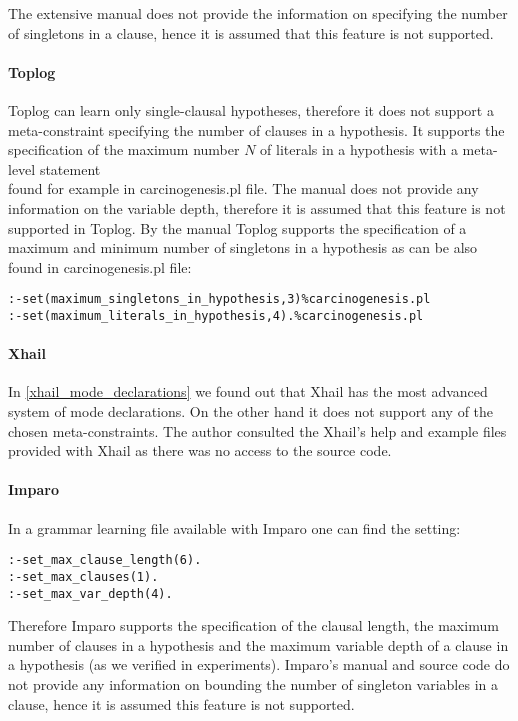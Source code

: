The extensive manual does not provide the information on specifying the number of singletons in a clause, hence it is assumed that this feature is not supported.

\paragraph{Toplog}
Toplog can learn only single-clausal hypotheses\cite{muggleton2012mc}, therefore it does not support a meta-constraint specifying the number of clauses in a hypothesis. It supports the specification of the maximum number $N$ of literals in a hypothesis with a meta-level statement\\
 found for example in carcinogenesis.pl file\cite{santos2008toplogWebsite}. The manual does not provide any information on the variable depth, therefore it is assumed that this feature is not supported in Toplog.
By the manual Toplog supports the specification of a maximum and minimum number of singletons in a hypothesis as can be also found in carcinogenesis.pl file:
\begin{lstlisting}
:-set(maximum_singletons_in_hypothesis,3)%carcinogenesis.pl
:-set(maximum_literals_in_hypothesis,4).%carcinogenesis.pl
\end{lstlisting}

\paragraph{Xhail}
In \ref{xhail_mode_declarations} we found out that Xhail has the most advanced system of mode declarations. On the other hand it does not support any of the chosen meta-constraints\cite{ray2007xhail}. The author consulted the Xhail's help and example files provided with Xhail as there was no access to the source code.

\paragraph{Imparo}
In a grammar learning file available with Imparo\cite{kimber2013imparo} one can find the setting:
\begin{lstlisting}
:-set_max_clause_length(6).
:-set_max_clauses(1).
:-set_max_var_depth(4).
\end{lstlisting}
Therefore Imparo supports the specification of the clausal length, the maximum number of clauses in a hypothesis and the maximum variable depth of a clause in a hypothesis (as we verified in experiments). Imparo's manual and source code do not provide any information on bounding the number of singleton variables in a clause, hence it is assumed this feature is not supported.

